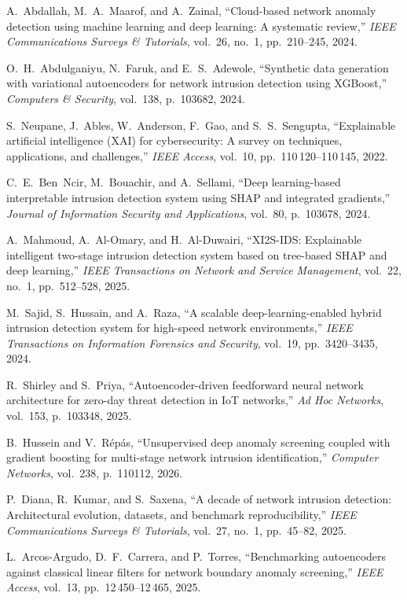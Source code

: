 \documentclass[12pt,a4paper]{report}
\begin{document}
\begin{enumerate}[label={[\arabic*]}, leftmargin=*, itemsep=4pt]
\item A.~Abdallah, M.~A.~Maarof, and A.~Zainal, ``Cloud-based network anomaly detection using machine learning and deep learning: A systematic review,'' \emph{IEEE Communications Surveys \& Tutorials}, vol.~26, no.~1, pp.~210--245, 2024.
\item O.~H.~Abdulganiyu, N.~Faruk, and E.~S.~Adewole, ``Synthetic data generation with variational autoencoders for network intrusion detection using XGBoost,'' \emph{Computers \& Security}, vol.~138, p.~103682, 2024.
\item S.~Neupane, J.~Ables, W.~Anderson, F.~Gao, and S.~S.~Sengupta, ``Explainable artificial intelligence (XAI) for cybersecurity: A survey on techniques, applications, and challenges,'' \emph{IEEE Access}, vol.~10, pp.~110\,120--110\,145, 2022.
\item C.~E.~Ben~Ncir, M.~Bouachir, and A.~Sellami, ``Deep learning-based interpretable intrusion detection system using SHAP and integrated gradients,'' \emph{Journal of Information Security and Applications}, vol.~80, p.~103678, 2024.
\item A.~Mahmoud, A.~Al-Omary, and H.~Al-Duwairi, ``XI2S-IDS: Explainable intelligent two-stage intrusion detection system based on tree-based SHAP and deep learning,'' \emph{IEEE Transactions on Network and Service Management}, vol.~22, no.~1, pp.~512--528, 2025.
\item M.~Sajid, S.~Hussain, and A.~Raza, ``A scalable deep-learning-enabled hybrid intrusion detection system for high-speed network environments,'' \emph{IEEE Transactions on Information Forensics and Security}, vol.~19, pp.~3420--3435, 2024.
\item R.~Shirley and S.~Priya, ``Autoencoder-driven feedforward neural network architecture for zero-day threat detection in IoT networks,'' \emph{Ad Hoc Networks}, vol.~153, p.~103348, 2025.
\item B.~Hussein and V.~R\'ep\'as, ``Unsupervised deep anomaly screening coupled with gradient boosting for multi-stage network intrusion identification,'' \emph{Computer Networks}, vol.~238, p.~110112, 2026.
\item P.~Diana, R.~Kumar, and S.~Saxena, ``A decade of network intrusion detection: Architectural evolution, datasets, and benchmark reproducibility,'' \emph{IEEE Communications Surveys \& Tutorials}, vol.~27, no.~1, pp.~45--82, 2025.
\item L.~Arcos-Argudo, D.~F.~Carrera, and P.~Torres, ``Benchmarking autoencoders against classical linear filters for network boundary anomaly screening,'' \emph{IEEE Access}, vol.~13, pp.~12\,450--12\,465, 2025.

\end{enumerate}
\end{document}
